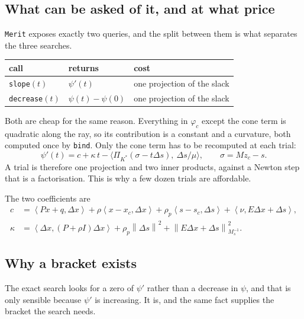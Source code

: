 \documentclass[a4paper,11pt]{book}
\theoremstyle{plain}
\theoremstyle{definition}
\theoremstyle{remark}
\numberwithin{equation}{chapter}
\numberwithin{algorithm}{chapter}
\newcommand{\proj}[2]{\Pi_{#2}\!\left(#1\right)}
\newcommand{\norm}[1]{\left\|#1\right\|}
\newcommand{\inner}[2]{\left\langle #1, #2 \right\rangle}
\begin{document}
	\subsection{What can be asked of it, and at what price}

	\texttt{Merit} exposes exactly two queries, and the split between them is what
	separates the three searches.

	\begin{table}[H]
		\centering\small
		\begin{tabular}{lll}
			\toprule
			call & returns & cost\\
			\midrule
			\texttt{slope}$(t)$ & $\psi'(t)$ & one projection of the slack\\
			\texttt{decrease}$(t)$ & $\psi(t)-\psi(0)$ & one projection of the
			slack\\
			\bottomrule
		\end{tabular}
	\end{table}

	Both are cheap for the same reason. Everything in $\varphi_c$ except the cone
	term is quadratic along the ray, so its contribution is a constant and a
	curvature, both computed once by \texttt{bind}. Only the cone term has to be
	recomputed at each trial:
	\begin{equation}\label{eq:meritslope}
		\psi'(t)=c+\kappa\,t
		-\bigl\langle\proj{\sigma-t\Delta s}{K^*},\ \Delta s/\mu\bigr\rangle,
		\qquad \sigma=Mz_c-s .
	\end{equation}
	A trial is therefore one projection and two inner products, against a Newton
	step that is a factorisation. This is why a few dozen trials are affordable.

	The two coefficients are
	\begin{align}
		c&=\inner{Px+q}{\Delta x}+\rho\inner{x-x_c}{\Delta x}
		+\rho_p\inner{s-s_c}{\Delta s}+\inner{\nu}{E\Delta x+\Delta s},\\
		\kappa&=\inner{\Delta x}{(P+\rho I)\Delta x}+\rho_p\norm{\Delta s}^2
		+\norm{E\Delta x+\Delta s}^2_{M_s^{-1}} .\label{eq:curvature}
	\end{align}

	\subsection{Why a bracket exists}

	The exact search looks for a zero of $\psi'$ rather than a decrease in
	$\psi$, and that is only sensible because $\psi'$ is increasing. It is, and
	the same fact supplies the bracket the search needs.
\end{document}
